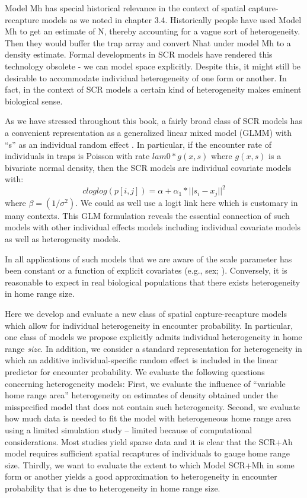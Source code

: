 Model Mh has special historical relevance in the context of spatial
capture-recapture models as we noted in chapter 3.4. Historically
people have used Model Mh to get an estimate of N, thereby accounting
for a vague sort of heterogeneity. Then they would buffer the trap
array and convert Nhat under model Mh to a density estimate.  Formal
developments in SCR models have rendered this technology obsolete - we
can model space explicitly.  Despite this, it might still be desirable
to accommodate individual heterogeneity of one form or another. In
fact, in the context of SCR models a certain kind of heterogeneity
makes eminent biological sense.

As we have stressed throughout this book, a fairly broad class of SCR
models has a convenient representation as a generalized linear mixed
model (GLMM) with ``s'' as an individual random effect
\citep{royle_etal:2009}.  In particular, if the encounter rate of
individuals in traps is Poisson with rate $lam0*g(x,s)$ where $g(x,s)$
is a bivariate normal density, then the SCR models are individual
covariate models with:
\[  
 cloglog(p[i,j]) = \alpha + \alpha_1*||s_{i} - x_{j}||^2 
\]
where $\beta = (1/\sigma^{2})$.  We could as well use a logit link
here which is customary in many contexts.  This GLM formulation
reveals the essential connection of such models with other individual
effects models including individual covariate models as well as
heterogeneity models.

In all applications of such models that we are aware of the scale
parameter has been constant or a function of explicit covariates
(e.g., sex; \citet{gardner_etal:2010}). Conversely, it is reasonable
to expect in real biological populations that there exists
heterogeneity in home range size.
  
Here we develop and evaluate a new class of spatial capture-recapture
models which allow for individual heterogeneity in encounter
probability.  In particular, one class of models we propose explicitly
admits individual heterogeneity in home range {\it size}. In addition,
we consider a standard representation for heterogeneity in which an
additive individual-specific random effect is included in the linear
predictor for encounter probability.  We evaluate the following
questions concerning heterogeneity models: First, we evaluate the
influence of ``variable home range area'' heterogeneity on estimates
of density obtained under the misspecified model that does not contain
such heterogeneity.  Second, we evaluate how much data is needed to
fit the model with heterogeneous home range area using a limited
simulation study -- limited because of computational considerations.
Most studies yield sparse data and it is clear that the SCR+Ah model
requires sufficient spatial recaptures of individuals to gauge home
range size.  Thirdly, we want to evaluate the extent to which Model
SCR+Mh in some form or another yields a good approximation to
heterogeneity in encounter probability that is due to heterogeneity in
home range size.

